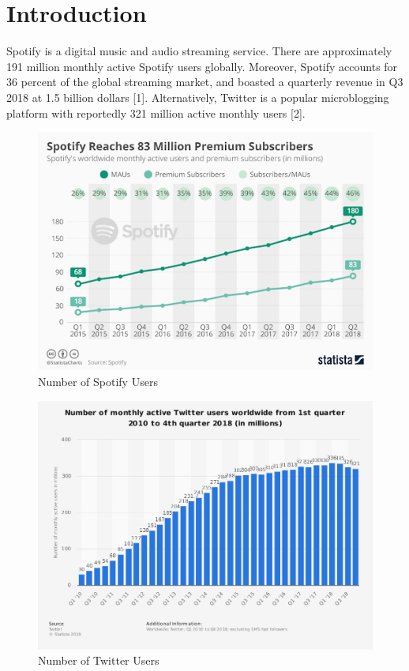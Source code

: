 \documentclass[12pt,conference]{IEEEtran}
\begin{document}
\section{Introduction}
Spotify is a digital music and audio streaming service. There are approximately 191 million monthly active Spotify users globally. Moreover, Spotify accounts for 36 percent of the global streaming market, and boasted a quarterly revenue in Q3 2018 at 1.5 billion dollars [1]. Alternatively, Twitter is a popular microblogging platform with reportedly 321 million active monthly users [2]. 
\begin{figure}[h!]
  \includegraphics[scale=0.48]{unnamed.png}
  \caption{Number of Spotify Users}
  \label{fig:birds}
\end{figure}
\begin{figure}[h!]
  \includegraphics[scale=0.25]{twitter.png}
  \caption{Number of Twitter Users}
  \label{fig:birds}
\end{figure}
\end{document}
